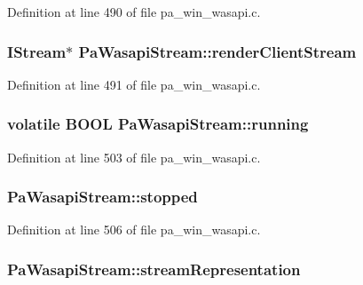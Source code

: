 Definition at line 490 of file pa\+\_\+win\+\_\+wasapi.\+c.

\subsubsection[{\texorpdfstring{render\+Client\+Stream}{renderClientStream}}]{\setlength{\rightskip}{0pt plus 5cm}I\+Stream$\ast$ Pa\+Wasapi\+Stream\+::render\+Client\+Stream}\hypertarget{struct_pa_wasapi_stream_ad546e7693db4ddf90b1ad148c43292bd}{}\label{struct_pa_wasapi_stream_ad546e7693db4ddf90b1ad148c43292bd}


Definition at line 491 of file pa\+\_\+win\+\_\+wasapi.\+c.

\subsubsection[{\texorpdfstring{running}{running}}]{\setlength{\rightskip}{0pt plus 5cm}volatile {\bf B\+O\+OL} Pa\+Wasapi\+Stream\+::running}\hypertarget{struct_pa_wasapi_stream_ac1313a56adbfbc1ce31b0f1ff30ab207}{}\label{struct_pa_wasapi_stream_ac1313a56adbfbc1ce31b0f1ff30ab207}


Definition at line 503 of file pa\+\_\+win\+\_\+wasapi.\+c.

\subsubsection[{\texorpdfstring{stopped}{stopped}}]{ Pa\+Wasapi\+Stream\+::stopped}\hypertarget{struct_pa_wasapi_stream_a9c3f5727f8a7d4f8cad386d0625799cf}{}\label{struct_pa_wasapi_stream_a9c3f5727f8a7d4f8cad386d0625799cf}


Definition at line 506 of file pa\+\_\+win\+\_\+wasapi.\+c.

\subsubsection[{\texorpdfstring{stream\+Representation}{streamRepresentation}}]{ Pa\+Wasapi\+Stream\+::stream\+Representation}\hypertarget{struct_pa_wasapi_stream_a05e4c67863aa5f87417a7c0ea031d1ee}{}\label{struct_pa_wasapi_stream_a05e4c67863aa5f87417a7c0ea031d1ee}


